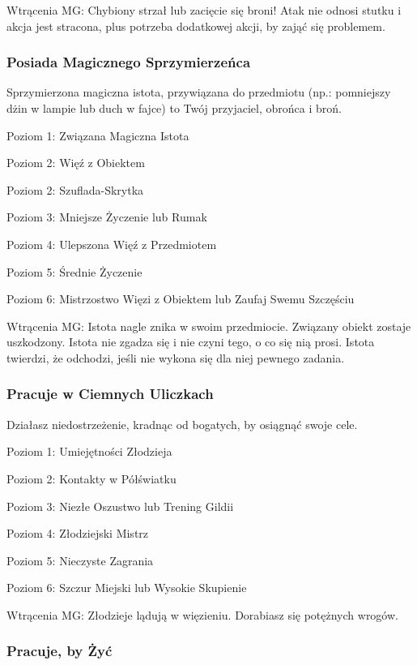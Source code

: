 Wtrącenia MG: Chybiony strzał lub zacięcie się broni! Atak nie odnosi stutku i akcja jest stracona, plus potrzeba dodatkowej akcji, by zająć się problemem. 

\subsubsection{Posiada Magicznego Sprzymierzeńca}

Sprzymierzona magiczna istota, przywiązana do przedmiotu (np.: pomniejszy dżin w lampie lub duch w fajce) to Twój przyjaciel, obrońca i broń.

Poziom 1: Związana Magiczna Istota

Poziom 2: Więź z Obiektem

Poziom 2: Szuflada-Skrytka

Poziom 3: Mniejsze Życzenie lub Rumak

Poziom 4: Ulepszona Więź z Przedmiotem

Poziom 5: Średnie Życzenie

Poziom 6: Mistrzostwo Więzi z Obiektem lub Zaufaj Swemu Szczęściu

Wtrącenia MG: Istota nagle znika w swoim przedmiocie. Związany obiekt zostaje uszkodzony. Istota nie zgadza się i nie czyni tego, o co się nią prosi. Istota twierdzi, że odchodzi, jeśli nie wykona się dla niej pewnego zadania.

\subsubsection{Pracuje w Ciemnych Uliczkach}

Działasz niedostrzeżenie, kradnąc od bogatych, by osiągnąć swoje cele.

Poziom 1: Umiejętności Złodzieja

Poziom 2: Kontakty w Półświatku

Poziom 3: Niezłe Oszustwo lub Trening Gildii

Poziom 4: Złodziejski Mistrz

Poziom 5: Nieczyste Zagrania

Poziom 6: Szczur Miejski lub Wysokie Skupienie

Wtrącenia MG: Złodzieje lądują w więzieniu. Dorabiasz się potężnych wrogów.

\subsubsection{Pracuje, by Żyć}

